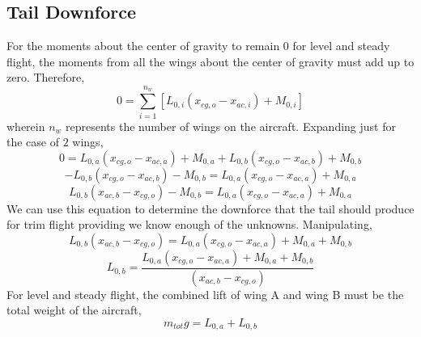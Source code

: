 \subsection{Tail Downforce}
\begin{comment}
\end{comment}
For the moments about the center of gravity to remain $0$ for level and steady flight, the moments from all the wings about the center of gravity must add up to zero. Therefore,
$$0 = \sum^{n_{w}}_{i = 1}\left[L_{0,i}(x_{cg,o}-x_{ac,i}) + M_{0,i}\right]$$
wherein $n_{w}$ represents the number of wings on the aircraft. Expanding just for the case of $2$ wings,
$$0 = L_{0,a}(x_{cg,o}-x_{ac,a}) + M_{0,a} + L_{0,b}(x_{cg,o}-x_{ac,b}) + M_{0,b}$$
$$ - L_{0,b}(x_{cg,o}-x_{ac,b}) - M_{0,b} = L_{0,a}(x_{cg,o}-x_{ac,a}) + M_{0,a}$$
$$L_{0,b}(x_{ac,b}-x_{cg,o}) - M_{0,b} = L_{0,a}(x_{cg,o}-x_{ac,a}) + M_{0,a}$$
We can use this equation to determine the downforce that the tail should produce for trim flight providing we know enough of the unknowns. Manipulating,
$$L_{0,b}(x_{ac,b}-x_{cg,o}) = L_{0,a}(x_{cg,o}-x_{ac,a}) + M_{0,a} + M_{0,b}$$
\begin{equation} L_{0,b} = \frac{L_{0,a}(x_{cg,o}-x_{ac,a}) + M_{0,a} + M_{0,b}}{(x_{ac,b}-x_{cg,o})} \label{tail downforce}\end{equation}
For level and steady flight, the combined lift of wing A and wing B must be the total weight of the aircraft,
$$m_{tot}g = L_{0,a} + L_{0,b}$$

